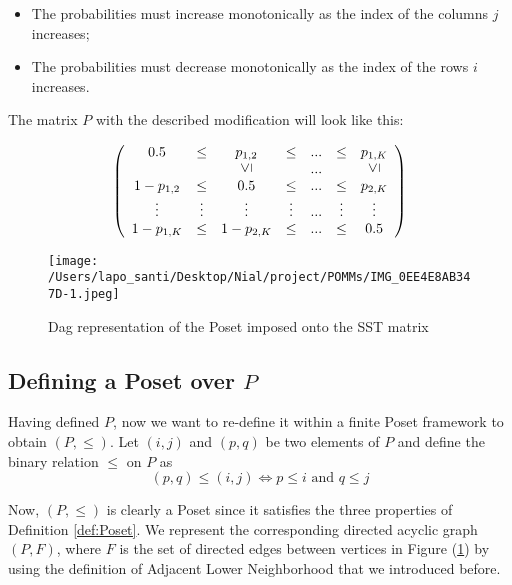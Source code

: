 \documentclass[11pt]{amsart}
\newcommand{\vertgeq}{\rotatebox{90}{$\leq$}}
\begin{document}
\begin{itemize}
\item The probabilities must increase monotonically as the index of the columns $j$ increases;
\item The probabilities must decrease monotonically as the index of the rows $i$ increases.
\end{itemize}
The matrix $P$ with the described modification will look like this: 
\begin{center}
$$
\left(\begin{array}{ccccccc} 0.5 & \leq & p_{1,2} & \leq &  ... & \leq & p_{1,K} \\  &  & \vertgeq &  & ... &  & \vertgeq \\
1 - p_{1,2} & \leq & 0.5 & \leq & ... & \leq & p_{2,K} \\ \vdots & \vdots & \vdots & \vdots &  ... & \vdots& \vdots \\ 1 - p_{1,K}& \leq & 1 - p_{2,K}& \leq & ... & \leq & 0.5\end{array}\right)
$$
\end{center}


\begin{figure}
\begin{center}
\texttt{[image: /Users/lapo\_santi/Desktop/Nial/project/POMMs/IMG\_0EE4E8AB347D-1.jpeg]}
\caption{Dag representation of the Poset imposed onto the SST matrix}
\label{fig:DAG}
\end{center}
\end{figure}

\subsection{Defining a Poset over $P$}
Having defined $P$, now we want to re-define it within a finite Poset framework to obtain $(P, \leq)$. Let $(i,j)$ and $(p,q)$ be two elements of $P$ and define the binary relation $\leq$ on $P$ as 
\begin{equation}
(p,q) \leq (i,j)  \iff p \leq i \text{ and } q \leq j
\end{equation}

Now, $(P, \leq)$ is clearly a Poset since it satisfies the three properties of Definition \eqref{def:Poset}. We represent the corresponding directed acyclic graph $(P,F)$, where $F$ is the set of directed edges between vertices in Figure (\ref{fig:DAG}) by using the definition of Adjacent Lower Neighborhood that we introduced before.
\end{document}
